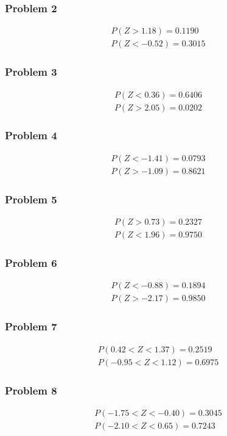\subsubsection{Problem 2}
\[
\begin{array}{l}
	P(Z>1.18)=0.1190\\
	P(Z<-0.52)=0.3015
\end{array}
\]

\subsubsection{Problem 3}
\[
\begin{array}{l}
	P(Z<0.36)=0.6406\\
	P(Z>2.05)=0.0202
\end{array}
\]

\subsubsection{Problem 4}
\[
\begin{array}{l}
	P(Z<-1.41)=0.0793\\
	P(Z>-1.09)=0.8621
\end{array}
\]

\subsubsection{Problem 5}
\[
\begin{array}{l}
	P(Z>0.73)=0.2327\\
	P(Z<1.96)=0.9750
\end{array}
\]

\subsubsection{Problem 6}
\[
\begin{array}{l}
	P(Z<-0.88)=0.1894\\
	P(Z>-2.17)=0.9850
\end{array}
\]

\subsubsection{Problem 7}
\[
\begin{array}{l}
	P(0.42<Z<1.37)=0.2519\\
	P(-0.95<Z<1.12)=0.6975
\end{array}
\]

\subsubsection{Problem 8}
\[
\begin{array}{l}
	P(-1.75<Z<-0.40)=0.3045\\
	P(-2.10<Z<0.65)=0.7243
\end{array}
\]

